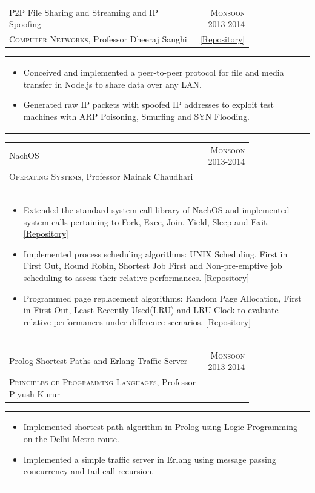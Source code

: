 \documentclass[a4paper,10pt]{article} %
\newcommand{\cproject}[5]{
    \begin{tabular}{p{0.80\linewidth}r}
        \textcolor{NavyBlue}{#2} & \multicolumn{1}{m{4cm}}{\raggedleft \textsc{#1}}\\
        #3 & #4
    \end{tabular}
    \begin{tabular}{p{\linewidth}}
    \vspace{-0.3cm}
        \footnotesize{#5}
    \end{tabular}
    \vspace{-0.5cm}
}
\begin{document}
\cproject
    {Monsoon 2013-2014}
    {P2P File Sharing and Streaming and IP Spoofing}
    {\textsc{Computer Networks}, Professor Dheeraj Sanghi}
    { \href{https://github.com/srijanshetty/nodesock}{ \footnotesize{[Repository]} } }
    {
        \begin{itemize}[leftmargin=0.5cm]
            \item Conceived and implemented a peer-to-peer protocol for file and media transfer in Node.js to share
                data over any LAN.
            \item Generated raw IP packets with spoofed IP addresses to exploit test machines with ARP Poisoning,
                Smurfing and SYN Flooding.
        \end{itemize}
    }

\cproject
    {Monsoon 2013-2014}
    {NachOS}
    {\textsc{Operating Systems}, Professor Mainak Chaudhari}
    {}
    {
     \begin{itemize}[leftmargin=0.5cm]
         \item Extended the standard system call library of NachOS and implemented system calls pertaining to Fork, Exec,
             Join, Yield, Sleep and Exit.
             \href{https://github.com/srijanshetty/nachos-syscalls/}{[Repository]}
         \item Implemented process scheduling algorithms: UNIX Scheduling, First in First Out,
             Round Robin, Shortest Job First and Non-pre-emptive job scheduling to assess their relative performances.
             \href{https://github.com/srijanshetty/nachos-scheduling}{[Repository]}
         \item Programmed page replacement algorithms: Random Page Allocation, First in First Out,
             Least Recently Used(LRU) and LRU Clock to evaluate relative performances under difference scenarios.
             \href{https://github.com/srijanshetty/nachos-final/}{[Repository]}
      \end{itemize}
    }

\cproject
    {Monsoon 2013-2014}
    {Prolog Shortest Paths and Erlang Traffic Server}
    {\textsc{Principles of Programming Languages}, Professor Piyush Kurur}
    {}
    {
       \begin{itemize}[leftmargin=0.5cm]
           \item Implemented shortest path algorithm in Prolog using Logic Programming on the Delhi Metro route.
           \item Implemented a simple traffic server in Erlang using message passing concurrency and tail call recursion.
       \end{itemize}
    }
\end{document}
